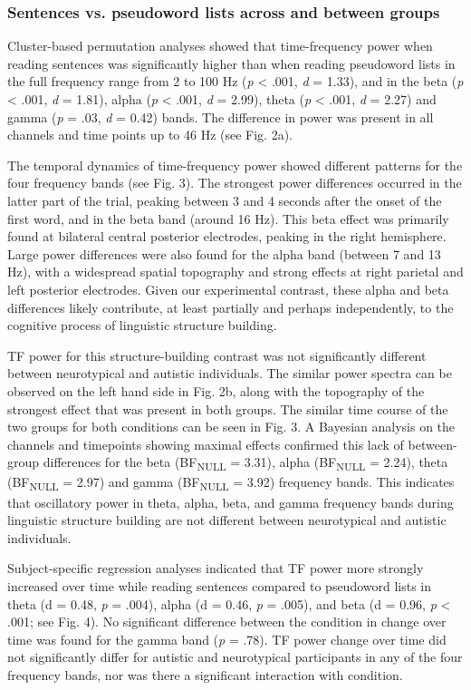 \subsubsection*{Sentences vs. pseudoword lists across and between groups}
Cluster-based permutation analyses showed that time-frequency power when reading sentences was significantly higher than when reading pseudoword lists in the full frequency range from 2 to 100 Hz (\textit{p} <  .001, \textit{d} = 1.33), and in the beta (\textit{p} <  .001, \textit{d} = 1.81), alpha (\textit{p} <  .001, \textit{d} = 2.99), theta (\textit{p} <  .001, \textit{d} = 2.27) and gamma (\textit{p} = .03, \textit{d} = 0.42) bands. The difference in power was present in all channels and time points up to 46 Hz (see Fig. 2a).  

The temporal dynamics of time-frequency power showed different patterns for the four frequency bands (see Fig. 3). The strongest power differences occurred in the latter part of the trial, peaking between 3 and 4 seconds after the onset of the first word, and in the beta band (around 16 Hz). This beta effect was primarily found at bilateral central posterior electrodes, peaking in the right hemisphere. Large power differences were also found for the alpha band (between 7 and 13 Hz), with a widespread spatial topography and strong effects at right parietal and left posterior electrodes. Given our experimental contrast, these alpha and beta differences likely contribute, at least partially and perhaps independently, to the cognitive process of linguistic structure building. 

TF power for this structure-building contrast was not significantly different between neurotypical and autistic individuals. The similar power spectra can be observed on the left hand side in Fig. 2b, along with the topography of the strongest effect that was present in both groups. The similar time course of the two groups for both conditions can be seen in Fig. 3. A Bayesian analysis on the channels and timepoints showing maximal effects confirmed this lack of between-group differences for the beta (BF\textsubscript{NULL} = 3.31), alpha (BF\textsubscript{NULL} = 2.24), theta (BF\textsubscript{NULL} = 2.97) and gamma (BF\textsubscript{NULL} = 3.92) frequency bands. This indicates that oscillatory power in theta, alpha, beta, and gamma frequency bands during linguistic structure building are not different between neurotypical and autistic individuals. 

Subject-specific regression analyses indicated that TF power more strongly increased over time while reading sentences compared to pseudoword lists in theta (d = 0.48, \textit{p} = .004), alpha (d = 0.46, \textit{p} = .005), and beta (d = 0.96, \textit{p} <  .001; see Fig. 4). No significant difference between the condition in change over time was found for the gamma band (\textit{p} = .78). TF power change over time did not significantly differ for autistic and neurotypical participants in any of the four frequency bands, nor was there a significant interaction with condition. 

